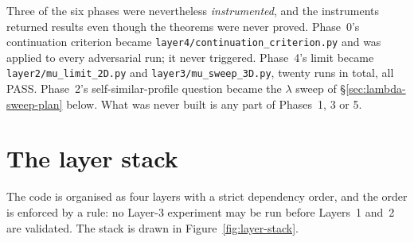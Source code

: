 Three of the six phases were nevertheless \emph{instrumented}, and the
instruments returned results even though the theorems were never proved.
Phase~0's continuation criterion became
\texttt{layer4/continuation\_criterion.py} and was applied to every
adversarial run; it never triggered. Phase~4's limit became
\texttt{layer2/mu\_limit\_2D.py} and \texttt{layer3/mu\_sweep\_3D.py}, twenty
runs in total, all \textsf{PASS}. Phase~2's self-similar-profile question
became the \(\lambda\) sweep of \S\ref{sec:lambda-sweep-plan} below. What was
never built is any part of Phases~1, 3 or 5.

\section{The layer stack}
\label{sec:layer-stack}

The code is organised as four layers with a strict dependency order, and the
order is enforced by a rule: no Layer-3 experiment may be run before Layers~1
and~2 are validated. The stack is drawn in Figure~\ref{fig:layer-stack}.

